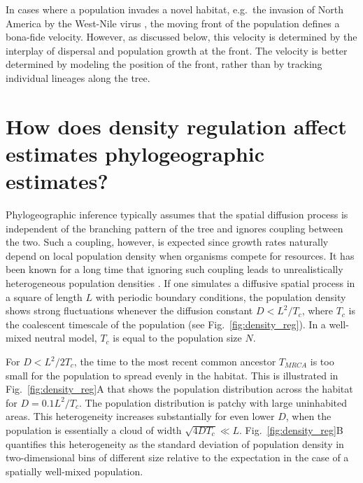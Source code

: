 \documentclass[aps,rmp, twocolumn]{revtex4}
\begin{document}
In cases where a population invades a novel habitat, e.g.~the invasion of North America by the West-Nile virus \citep{pybus_unifying_2012}, the moving front of the population defines a bona-fide velocity.
However, as discussed below, this velocity is determined by the interplay of dispersal and population growth at the front.
The velocity is better determined by modeling the position of the front, rather than by tracking individual lineages along the tree.


\section*{How does density regulation affect estimates phylogeographic estimates?}
Phylogeographic inference typically assumes that the spatial diffusion process is independent of the branching pattern of the tree and ignores coupling between the two.
Such a coupling, however, is expected since growth rates naturally depend on local population density when organisms compete for resources.
It has been known for a long time that ignoring such coupling leads to unrealistically heterogeneous population densities \citep{felsenstein_pain_1975}.
If one simulates a diffusive spatial process in a square of length $L$ with periodic boundary conditions, the population density shows strong fluctuations whenever the diffusion constant $D<L^2/T_c$, where $T_c$ is the coalescent timescale of the population (see Fig.~\ref{fig:density_reg}).
In a well-mixed neutral model, $T_c$ is equal to the population size $N$.

For $D<L^2/2T_c$, the time to the most recent common ancestor $T_{MRCA}$ is too small for the population to spread evenly in the habitat.
This is illustrated in Fig.~\ref{fig:density_reg}A that shows the population distribution across the habitat for $D=0.1L^2/T_c$.
The population distribution is patchy with large uninhabited areas.
This heterogeneity increases substantially for even lower $D$, when the population is essentially a cloud of width $\sqrt{4DT_c}\ll L$.
Fig.~\ref{fig:density_reg}B quantifies this heterogeneity as the standard deviation of population density in two-dimensional bins of different size  relative to the expectation in the case of a spatially well-mixed population.
\end{document}
